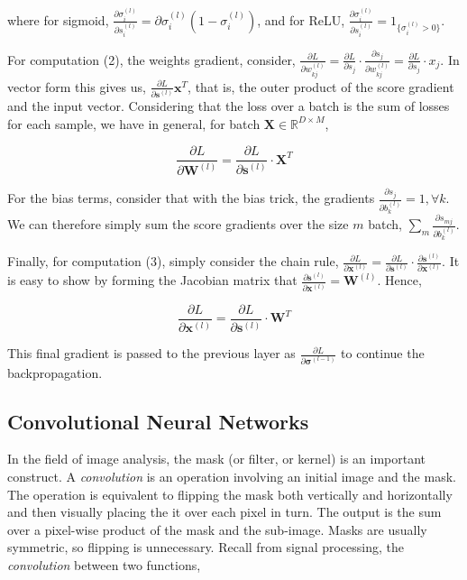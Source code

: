 \documentclass[11pt]{amsart}
\begin{document}
where for sigmoid, $\frac{\partial\sigma_i^{(l)}}{\partial{s}_i^{(l)}} = \partial\sigma_i^{(l)}(1 - \sigma_i^{(l)})$, and for ReLU, $\frac{\partial\sigma_i^{(l)}}{\partial{s}_i^{(l)}} = 1_{\{\sigma_i^{(l)} > 0\}}$.

For computation (2), the weights gradient, consider, $\frac{\partial L}{\partial w_{kj}^{(l)}} = \frac{\partial L}{\partial s_j}\cdot\frac{\partial s_j}{\partial w_{kj}^{(l)}} = \frac{\partial L}{\partial s_j}\cdot x_j$. In vector form this gives us, $\frac{\partial L}{\partial \mathbf{s}^{(l)}}\mathbf{x}^T$, that is, the outer product of the score gradient and the input vector. Considering that the loss over a batch is the sum of losses for each sample, we have in general, for batch $\mathbf{X} \in \mathbb{R}^{D \times M}$,

$$\frac{\partial L}{\partial \mathbf{W}^{(l)}} = \frac{\partial L}{\partial \mathbf{s}^{(l)}}\cdot\mathbf{X}^T$$

For the bias terms, consider that with the bias trick, the gradients $\frac{\partial s_j}{\partial b_{k}^{(l)}} = 1, \forall k$. We can therefore simply sum the score gradients over the size $m$ batch, $\sum_m\frac{\partial s_{mj}}{\partial b_{k}^{(l)}}$. 

Finally, for computation (3), simply consider the chain rule, $\frac{\partial L}{\partial\mathbf{x}^{(l)}} = \frac{\partial L}{\partial\mathbf{s}^{(l)}}\cdot\frac{\partial\mathbf{s}^{(l)}}{\partial\mathbf{x}^{(l)}}.$ It is easy to show by forming the Jacobian matrix that $\frac{\partial\mathbf{s}^{(l)}}{\partial\mathbf{x}^{(l)}} = \mathbf{W}^{(l)}$. Hence,

$$\frac{\partial L}{\partial \mathbf{x}^{(l)}} = \frac{\partial L}{\partial \mathbf{s}^{(l)}}\cdot\mathbf{W}^T$$

This final gradient is passed to the previous layer as $\frac{\partial L}{\partial \boldsymbol{\sigma}^{(l-1)}}$ to continue the backpropagation.

\subsection{Convolutional Neural Networks}

In the field of image analysis, the mask (or filter, or kernel) is an important construct. A \emph{convolution} is an operation involving an initial image and the mask. The operation is equivalent to flipping the mask both vertically and horizontally and then visually placing the it over each pixel in turn. The output is the sum over a pixel-wise product of the mask and the sub-image. Masks are usually symmetric, so flipping is unnecessary. Recall from signal processing, the \emph{convolution} between two functions,
\end{document}
